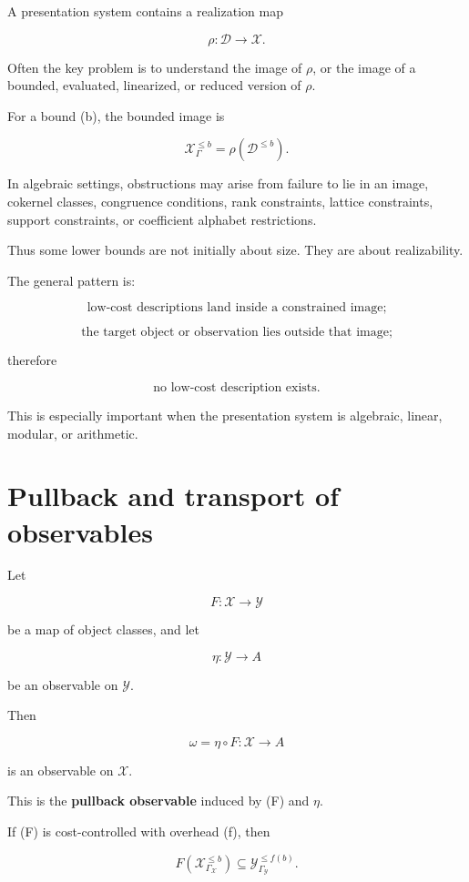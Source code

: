 \documentclass[11pt]{article}
\begin{document}
A presentation system contains a realization map

\[
\rho:\mathcal D\to\mathcal X.
\]

Often the key problem is to understand the image of \(\rho\), or the image of a bounded, evaluated, linearized, or reduced version of \(\rho\).

For a bound (b), the bounded image is

\[
\mathcal X_\Gamma^{\leq b}=\rho(\mathcal D^{\leq b}).
\]

In algebraic settings, obstructions may arise from failure to lie in an image, cokernel classes, congruence conditions, rank constraints, lattice constraints, support constraints, or coefficient alphabet restrictions.

Thus some lower bounds are not initially about size. They are about realizability.

The general pattern is:

\[
\text{low-cost descriptions land inside a constrained image;}
\]

\[
\text{the target object or observation lies outside that image;}
\]

therefore

\[
\text{no low-cost description exists.}
\]

This is especially important when the presentation system is algebraic, linear, modular, or arithmetic.


\section{Pullback and transport of observables}

Let

\[
F:\mathcal X\to\mathcal Y
\]

be a map of object classes, and let

\[
\eta:\mathcal Y\to A
\]

be an observable on \(\mathcal Y\).

Then

\[
\omega=\eta\circ F:\mathcal X\to A
\]

is an observable on \(\mathcal X\).

This is the \textbf{pullback observable} induced by (F) and \(\eta\).

If (F) is cost-controlled with overhead (f), then

\[
F(\mathcal X_{\Gamma_\mathcal X}^{\leq b})
\subseteq
\mathcal Y_{\Gamma_\mathcal Y}^{\leq f(b)}.
\]
\end{document}

